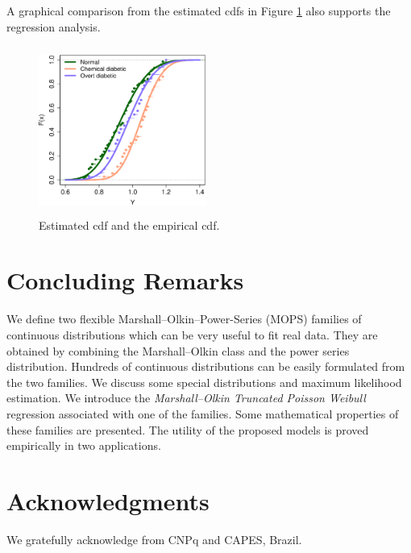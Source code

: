 \documentclass[12pt]{article}
\begin{document}
A graphical comparison from the estimated cdfs in Figure \ref{diferenca} also supports the regression analysis.
		\begin{figure}[!htb]
			\begin{center}
				\includegraphics[width=5.5cm,height=5.5cm]{diferenca.eps}
				\caption{Estimated cdf and the empirical cdf.}
				\label{diferenca}
			\end{center}
		\end{figure}


\section{Concluding Remarks}\label{conclusions}

We define two flexible Marshall--Olkin--Power-Series (MOPS) families of continuous distributions which can be very useful to fit real data.
They are obtained by combining the Marshall--Olkin class \citep{MarshallOlkin1997} and the power series
distribution. Hundreds of continuous distributions can be easily formulated from the two families. We discuss some special distributions and maximum
likelihood estimation. We introduce the {\it Marshall--Olkin Truncated Poisson Weibull} regression associated with one of the families.
Some mathematical properties of these families are presented. The utility of the proposed models is proved empirically in two
applications.


\section*{Acknowledgments}

We gratefully acknowledge from CNPq and CAPES, Brazil.
\end{document}
